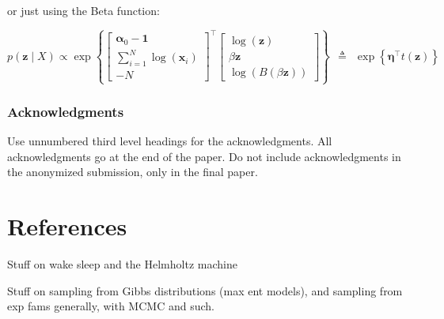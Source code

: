 \documentclass{article}
\begin{document}
or just using the Beta function:

$$
p(\pmb{z} \mid X) \propto \exp\left\{\begin{bmatrix} \pmb{\alpha}_0 - \pmb{1} \\  \sum_{i=1}^N \log(\pmb{x}_i)  \\ -N  \end{bmatrix}^\top \begin{bmatrix} \log(\pmb{z}) \\ \beta \pmb{z} \\ \log (B( \beta \pmb{z})) \end{bmatrix} \right\}  ~~\triangleq~~ \exp\left\{ \pmb{\eta}^\top t(\pmb{z}) \right\}
$$


%

  
\clearpage

\subsubsection*{Acknowledgments}

Use unnumbered third level headings for the acknowledgments. All
acknowledgments go at the end of the paper. Do not include
acknowledgments in the anonymized submission, only in the final paper.

\section*{References}




Stuff on wake sleep and the Helmholtz machine

Stuff on sampling from Gibbs distributions (max ent models), and sampling from exp fams generally, with MCMC and such.
\end{document}
